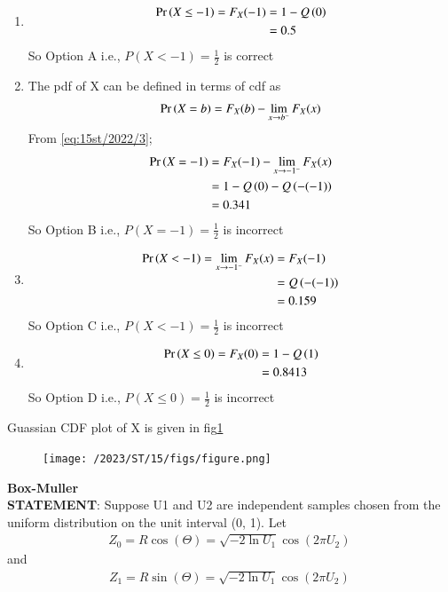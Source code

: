 \documentclass[article]{IEEEtran}
\theoremstyle{remark}
\begin{document}
\begin{enumerate}
\item \begin{align}
	\Pr\left(X \le -1\right) = F_X(-1) &= 1 - Q\left(0\right) \\
	&= 0.5
\end{align}
So Option A i.e., $P(X < -1) = \frac{1}{2}$ is correct
\item The pdf of X can be defined in terms of cdf as 
\begin{align}
	\Pr\left(X = b\right) = F_X(b) - \lim_{x \to b^-}F_X(x) \label{eq:15st/2022/3}
\end{align}
From \eqref{eq:15st/2022/3};
\begin{align}
	\Pr\left(X = -1\right) &= F_X(-1) - \lim_{x \to -1^-}F_X(x)\\
	&= 1-Q\left(0\right) - Q\left(-(-1)\right)\\
	&= 0.341
\end{align} 
So Option B i.e., $P(X = -1) = \frac{1}{2}$ is incorrect
\item  \begin{align}
	\Pr\left(X < -1\right) = \lim_{x \to -1^-}F_X(x)&= F_X(-1) \\
	&= Q\left(-(-1)\right)\\
	&= 0.159
\end{align}
So Option C i.e., $P(X < -1) = \frac{1}{2}$ is incorrect
\item \begin{align}
	\Pr\left(X \leq 0\right) = F_X(0)	&= 1 - Q\left(1\right) \\
	&= 0.8413
\end{align}
So Option D i.e., $P(X \leq 0) = \frac{1}{2}$ is incorrect
\end{enumerate}
\newpage
Guassian CDF plot of X is given in fig\ref{fig:15st/2022} \\
\begin{figure}[ht!]
    \centering
    \texttt{[image: /2023/ST/15/figs/figure.png]}
    \caption{}
    \label{fig:15st/2022}
\end{figure}
\newpage
\textbf{Box-Muller}\\
\textbf{STATEMENT}:
  Suppose U1 and U2 are independent samples chosen from the uniform distribution on the unit interval (0, 1). Let
  \begin{align}
  	Z_0 = R \cos(\Theta) =\sqrt{-2 \ln U_1} \cos(2 \pi U_2)\,
  \end{align}
   and
  \begin{align}
  	Z_1 = R \sin(\Theta) =\sqrt{-2 \ln U_1} \cos(2 \pi U_2)\, 
  \end{align}
\end{document}
